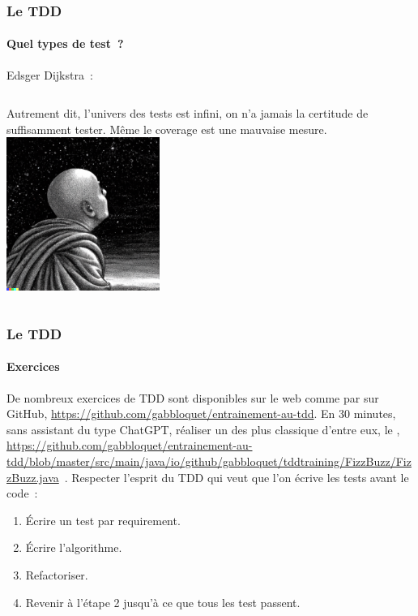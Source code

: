 \documentclass{beamer}
\begin{document}
    \begin{frame}
        \transdissolve
        \frametitle{Le TDD}
        \framesubtitle{Quel types de test~?}
        Edsger Dijkstra~: 
        \bigbreak
        \begin{columns}
            Autrement dit, l'univers des tests est infini, on n'a jamais la certitude de suffisamment tester.
            \bigbreak
            Même le coverage est une mauvaise mesure.
            \centering
            \includegraphics[width=5cm]{image/monk-looking-the-deepness-of-the-stars-in-the-night-sky}
        \end{columns}
    \end{frame}

    \begin{frame}
        \transdissolve
        \frametitle{Le TDD}
        \framesubtitle{Exercices \execcounterdispinc{}}
        De nombreux exercices de TDD sont disponibles sur le web comme par sur GitHub, \url{https://github.com/gabbloquet/entrainement-au-tdd}.
        \bigbreak
        En 30 minutes, sans assistant du type ChatGPT, réaliser un des plus classique d'entre eux, le , \url{https://github.com/gabbloquet/entrainement-au-tdd/blob/master/src/main/java/io/github/gabbloquet/tddtraining/FizzBuzz/FizzBuzz.java}~.
        Respecter l'esprit du TDD qui veut que l'on écrive les tests avant le code~:
        \begin{enumerate}
            \item Écrire un test par requirement.
            \item Écrire l'algorithme.
            \item Refactoriser.
            \item Revenir à l'étape 2 jusqu'à ce que tous les test passent.
        \end{enumerate}

    \end{frame}
\end{document}
